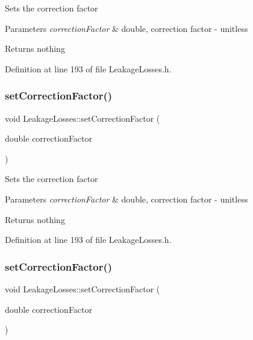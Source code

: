 Sets the correction factor


\begin{DoxyParams}{Parameters}
{\em correction\+Factor} & double, correction factor -\/ unitless\\
\hline
\end{DoxyParams}
\begin{DoxyReturn}{Returns}
nothing 
\end{DoxyReturn}


Definition at line 193 of file Leakage\+Losses.\+h.

\mbox{\label{class_leakage_losses_a1af53750d5d9573dffa8674b3479e8d6}} 
\subsubsection{\texorpdfstring{set\+Correction\+Factor()}{setCorrectionFactor()}\hspace{0.1cm}{\footnotesize\ttfamily [2/3]}}
{\footnotesize\ttfamily void Leakage\+Losses\+::set\+Correction\+Factor (\begin{DoxyParamCaption}\item[{double}]{correction\+Factor }\end{DoxyParamCaption})\hspace{0.3cm}{\ttfamily [inline]}}

Sets the correction factor


\begin{DoxyParams}{Parameters}
{\em correction\+Factor} & double, correction factor -\/ unitless\\
\hline
\end{DoxyParams}
\begin{DoxyReturn}{Returns}
nothing 
\end{DoxyReturn}


Definition at line 193 of file Leakage\+Losses.\+h.

\mbox{\label{class_leakage_losses_a1af53750d5d9573dffa8674b3479e8d6}} 
\subsubsection{\texorpdfstring{set\+Correction\+Factor()}{setCorrectionFactor()}\hspace{0.1cm}{\footnotesize\ttfamily [3/3]}}
{\footnotesize\ttfamily void Leakage\+Losses\+::set\+Correction\+Factor (\begin{DoxyParamCaption}\item[{double}]{correction\+Factor }\end{DoxyParamCaption})\hspace{0.3cm}{\ttfamily [inline]}}

